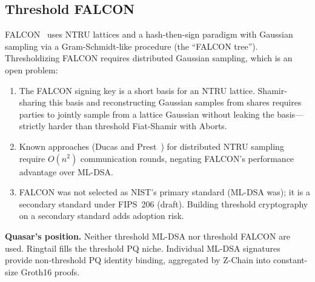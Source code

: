 \subsection{Threshold FALCON}

FALCON~\cite{falcon-spec} uses NTRU lattices and a hash-then-sign
paradigm with Gaussian sampling via a Gram-Schmidt-like procedure
(the ``FALCON tree'').  Thresholdizing FALCON requires distributed
Gaussian sampling, which is an open problem:

\begin{enumerate}[nosep]
  \item The FALCON signing key is a short basis for an NTRU lattice.
    Shamir-sharing this basis and reconstructing Gaussian samples from
    shares requires parties to jointly sample from a lattice Gaussian
    without leaking the basis---strictly harder than threshold
    Fiat-Shamir with Aborts.

  \item Known approaches (Ducas and Prest~\cite{ducas2016}) for
    distributed NTRU sampling require $O(n^2)$ communication rounds,
    negating FALCON's performance advantage over ML-DSA.

  \item FALCON was not selected as NIST's primary standard (ML-DSA
    was); it is a secondary standard under FIPS~206 (draft).  Building
    threshold cryptography on a secondary standard adds adoption risk.
\end{enumerate}

\textbf{Quasar's position.}  Neither threshold ML-DSA nor threshold
FALCON are used.  Ringtail fills the threshold PQ niche.  Individual
ML-DSA signatures provide non-threshold PQ identity binding, aggregated
by Z-Chain into constant-size Groth16 proofs.

